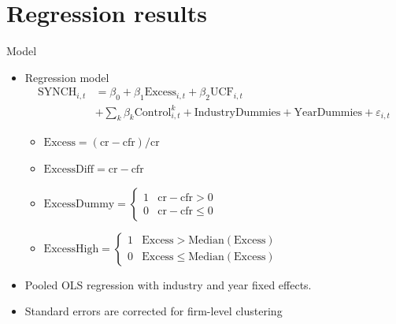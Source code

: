 \documentclass{beamer}
\begin{document}
\section{Regression results}
\begin{frame}{Model}
	\begin{itemize}
		\item  Regression model
		 \begin{equation*}
			\begin{split}
				\text{SYNCH}_{i,t} & =  \beta_0 + \beta_1\text{Excess}_{i,t}
			+ \beta_2\text{UCF}_{i,t}\\
			& 
			+ \sum_{k}\beta_k \text{Control}_{i,t}^k +
			\text{IndustryDummies} + \text{YearDummies} + \varepsilon_{i,t}
			\end{split}
		\end{equation*}
		\begin{itemize}
		\tiny
		\item $ \text{Excess} = (\text{cr} - \text{cfr})/\text{cr} $
		\item $ \text{ExcessDiff} = \text{cr} - \text{cfr} $
		\item $ \text{ExcessDummy} = \left\{\begin{array}{ll}
			1 & \text{cr} - \text{cfr}>0\\
			0 & \text{cr} - \text{cfr}\leq 0
		\end{array}\right.  $
		\item $ \text{ExcessHigh} = \left\{\begin{array}{ll}
			1 & \text{Excess}>\text{Median}(\text{Excess})\\
			0 & \text{Excess}\leq \text{Median}(\text{Excess})
		\end{array}\right.  $
	\end{itemize}
\item Pooled OLS
regression with industry and year fixed effects. 
\item Standard errors are corrected for firm-level clustering

	\end{itemize}
\end{frame}
\end{document}
